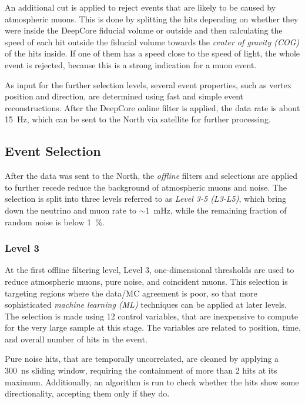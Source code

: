 An additional cut is applied to reject events that are likely to be caused by atmospheric muons. This is done by splitting the hits depending on whether they were inside the DeepCore fiducial volume or outside and then calculating the speed of each hit outside the fiducial volume towards the \textit{center of gravity (COG)} of the hits inside. If one of them has a speed close to the speed of light, the whole event is rejected, because this is a strong indication for a muon event.

As input for the further selection levels, several event properties, such as vertex position and direction, are determined using fast and simple event reconstructions. After the DeepCore online filter is applied, the data rate is about \SI{15}{\hertz}, which can be sent to the North via satellite for further processing.


\subsection{Event Selection} 

After the data was sent to the North, the \textit{offline} filters and selections are applied to further recede reduce the background of atmospheric muons and noise. The selection is split into three levels referred to as \textit{Level 3-5 (L3-L5)}, which bring down the neutrino and muon rate to $\sim$\SI{1}{\milli\hertz}, while the remaining fraction of random noise is below \SI{1}{\percent}.



\subsubsection{Level 3} 

At the first offline filtering level, Level 3, one-dimensional thresholds are used to reduce atmospheric muons, pure noise, and coincident muons. This selection is targeting regions where the data/MC agreement is poor, so that more sophisticated \textit{machine learning (ML)} techniques can be applied at later levels. The selection is made using 12 control variables, that are inexpensive to compute for the very large sample at this stage. The variables are related to position, time, and overall number of hits in the event.

Pure noise hits, that are temporally uncorrelated, are cleaned by applying a \SI{300}{\nano\second} sliding window, requiring the containment of more than 2 hits at its maximum. Additionally, an algorithm is run to check whether the hits show some directionality, accepting them only if they do.

